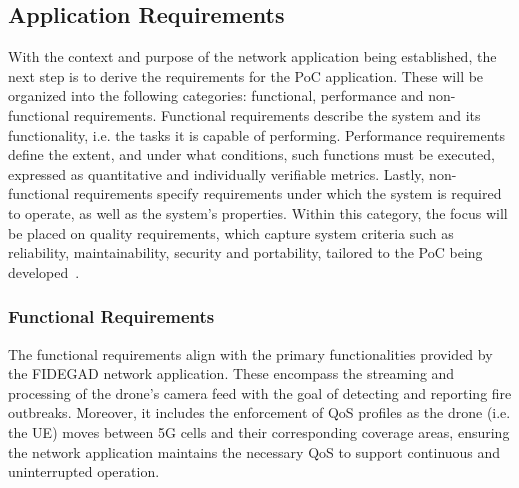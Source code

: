 \subsection{Application Requirements}

With the context and purpose of the network application being established, the next step is to derive the requirements for the \acs{PoC} application. These will be organized into the following categories: functional, performance and non-functional requirements. Functional requirements describe the system and its functionality, i.e. the tasks it is capable of performing. Performance requirements define the extent, and under what conditions, such functions must be executed, expressed as quantitative and individually verifiable metrics. Lastly, non-functional requirements specify requirements under which the system is required to operate, as well as the system's properties. Within this category, the focus will be placed on quality requirements, which capture system criteria such as reliability, maintainability, security and portability, tailored to the \acs{PoC} being developed~\cite{ISORequirementsEngineering}.

\subsubsection{Functional Requirements}

The functional requirements align with the primary functionalities provided by the \acs{FIDEGAD} network application. These encompass the streaming and processing of the drone's camera feed with the goal of detecting and reporting fire outbreaks. Moreover, it includes the enforcement of \acs{QoS} profiles as the drone (i.e. the \acs{UE}) moves between \acs{5G} cells and their corresponding coverage areas, ensuring the network application maintains the necessary \acs{QoS} to support continuous and uninterrupted operation.


